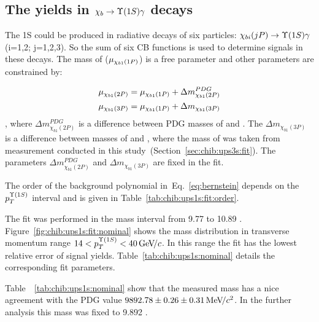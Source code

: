 \subsection{The \texorpdfstring{\chib}{xb} yields in
\texorpdfstring{$\chib \to \Y1S \gamma$}{chib -> Y\(1S\) gamma } decays}
\label{sec:chib:ups1s:fit}

The \Y1S could be produced in radiative decays of six \chib particles:
$\chi_{bi}(jP) \to \Y1S \gamma$ (i=1,2; j=1,2,3). So the sum of six CB functions
is used to determine \chib signals in these decays. The mass of \chiboneOneP
($\mu_{\chi_{b 1}(1P)}$) is a free parameter and  other parameters are constrained 
by:

\begin{equation}
  \begin{aligned}
\mu_{\chi_{b 1}(2P)} = \mu_{\chi_{b 1}(1P)} + \Delta m_{\chi_{b1}(2P)}^{PDG} \\
\mu_{\chi_{b 1}(3P)} = \mu_{\chi_{b 1}(1P)} + \Delta m_{\chi_{b1}(3P)} \\
  \end{aligned}
\end{equation}
, where $\Delta m_{\chi_{b1}(2P)}^{PDG}$ is a difference between PDG masses of
\chiboneTwoP and \chiboneOneP. The $\Delta  m_{\chi_{b1}(3P)}$ is a difference
between masses of \chiboneThreeP and \chiboneOneP, where the mass of
\chiboneThreeP was taken from measurement conducted in this
study~(Section~\ref{sec:chib:ups3s:fit}). The parameters  $\Delta
m_{\chi_{b1}(2P)}^{PDG}$ and $\Delta  m_{\chi_{b1}(3P)}$ are fixed in the fit.

The order of the background polynomial in~Eq.~\ref{eq:bernstein} depends on the
$p_{T}^{\OneS}$ interval and is given in Table~\ref{tab:chib:ups1s:fit:order}.



The fit was performed in the mass interval from  9.77 \gevcc to 10.89 \gevcc.
Figure~\ref{fig:chib:ups1s:fit:nominal} shows the mass distribution in transverse
momentum range $14 < p_T^{\OneS} < 40 \gevc$. In this range the fit has
the lowest relative error of signal yields. Table~\ref{tab:chib:ups1s:nominal}
details the corresponding fit parameters.




Table~~\ref{tab:chib:ups1s:nominal} show that the measured \chiboneOneP mass
has a nice agreement with the PDG value $9892.78 \pm 0.26 \pm 0.31 {\mathrm{\,Me\kern -0.1em V\!/}c^2}$.
In the further analysis this mass was fixed to 9.892 \gevcc.



